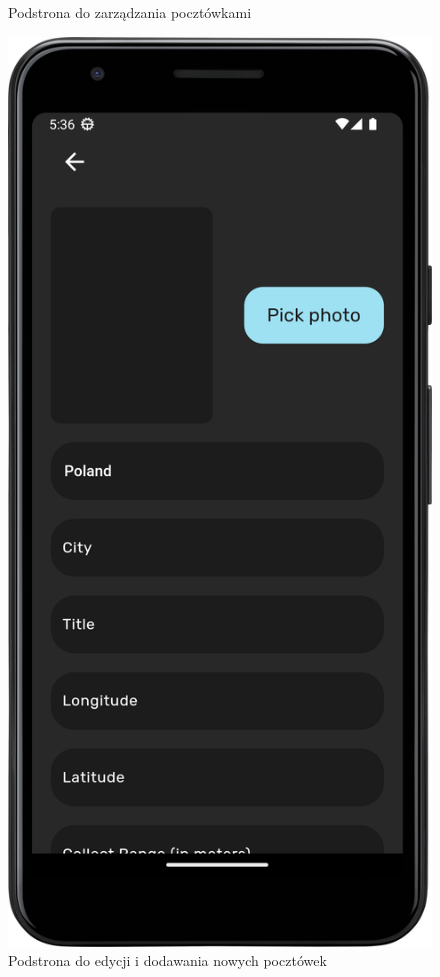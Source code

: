 \documentclass[a4paper,twoside,12pt]{book}
\begin{document}
\begin{figure}[H]
\begin{minipage}[b]{0.49\textwidth}
    \caption{Podstrona do zarządzania pocztówkami}
  \end{minipage}
  \hfill
  \begin{minipage}[b]{0.49\textwidth}
    \includegraphics[width=\textwidth]{mobile_ss/admin_edit.png}
    \caption{Podstrona do edycji i dodawania nowych pocztówek}
  \end{minipage}
\end{figure}
\newpage
\end{document}
